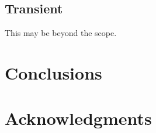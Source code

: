 \documentclass[preprint,authoryear,12pt]{elsarticle}
\begin{document}
\subsection{Transient}
\label{sec:r-d-transient}

This may be beyond the scope.  

\section{Conclusions}
\label{sec:conclusions}


\section*{Acknowledgments}
\label{sec:acknowledgements}



\end{document}
